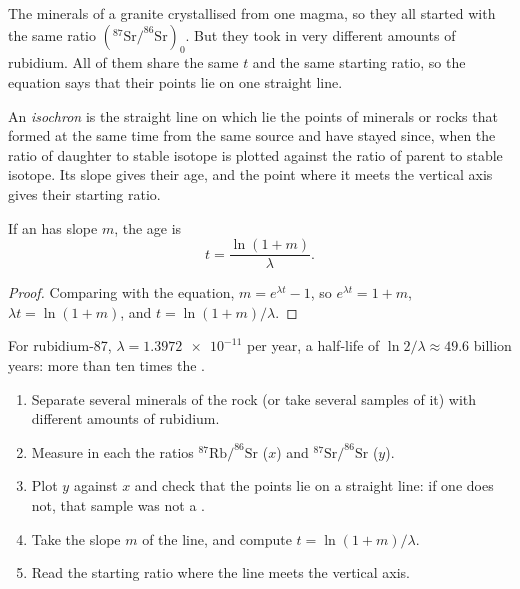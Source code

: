 The minerals of a granite crystallised from one magma, so they all started
with the same ratio $(^{87}\mathrm{Sr}/^{86}\mathrm{Sr})_0$. But they took in
very different amounts of rubidium. All of them share the same $t$ and the same starting ratio, so the
equation says that their points lie on one straight line.

\begin{definition}[Isochron]\label{def:g12:age-of-the-earth:isochron}
An \emph{isochron} is the straight line on which lie the
points of minerals or rocks that formed at the same time from the same
source and have stayed  since, when the ratio of daughter to
stable isotope is plotted against the ratio of parent to stable isotope. Its
slope gives their age, and the point where it meets the vertical axis gives
their starting ratio.
\end{definition}

\begin{proposition}\label{prop:g12:age-of-the-earth:slope}
If an  has slope $m$, the age is
\[
  t = \frac{\ln(1+m)}{\lambda}.
\]
\end{proposition}

\begin{proof}
Comparing with the  equation, $m = e^{\lambda t} - 1$, so
$e^{\lambda t} = 1 + m$, $\lambda t = \ln(1+m)$, and $t = \ln(1+m)/\lambda$.
\end{proof}

For rubidium-87, $\lambda = \num{1.3972e-11}$ per year, a half-life of
$\ln 2/\lambda \approx 49.6$ billion years: more than ten times the .

\begin{method}\label{met:g12:age-of-the-earth:isochron}
\begin{enumerate}
  \item Separate several minerals of the rock (or take several samples of
        it) with different amounts of rubidium.
  \item Measure in each the ratios $^{87}\mathrm{Rb}/^{86}\mathrm{Sr}$ ($x$)
        and $^{87}\mathrm{Sr}/^{86}\mathrm{Sr}$ ($y$).
  \item Plot $y$ against $x$ and check that the points lie on a straight
        line: if one does not, that sample was not a .
  \item Take the slope $m$ of the line, and compute $t = \ln(1+m)/\lambda$.
  \item Read the starting ratio where the line meets the vertical axis.
\end{enumerate}
\end{method}

